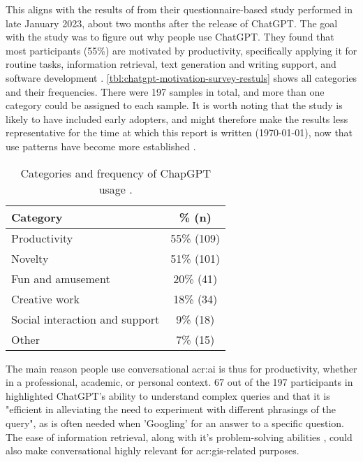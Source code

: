 This aligns with the results of \cite{skjuveWhyPeopleUse2023} from their questionnaire-based study performed in late January 2023, about two months after the release of ChatGPT. The goal with the study was to figure out why people use ChatGPT. They found that most participants (55\%) are motivated by productivity, specifically applying it for routine tasks, information retrieval, text generation and writing support, and software development \citep[17-21]{skjuveWhyPeopleUse2023}. \autoref{tbl:chatgpt-motivation-survey-restuls} shows all categories and their frequencies. There were 197 samples in total, and more than one category could be  assigned to each sample. It is worth noting that the study is likely to have included early adopters, and might therefore make the results less representative for the time at which this report is written (\today), now that use patterns have become more established \citep[37]{skjuveWhyPeopleUse2023}.

\begin{table}[ht]
    \centering
    \begin{tabular}[t]{l|c}
        \toprule
        \textbf{Category}              & \% \textbf{(n)} \\
        \midrule
        Productivity                   & 55\% (109)      \\
        Novelty                        & 51\% (101)      \\
        Fun and amusement              & 20\% (41)       \\
        Creative work                  & 18\% (34)       \\
        Social interaction and support & 9\% (18)        \\
        Other                          & 7\% (15)        \\
        \bottomrule
    \end{tabular}
    \caption{Categories and frequency of ChapGPT usage \citep[16-17]{skjuveWhyPeopleUse2023}.}
    \label{tbl:chatgpt-motivation-survey-restuls}
\end{table}

The main reason people use conversational \acrshort{acr:ai} is thus for productivity, whether in a professional, academic, or personal context. 67 out of the 197 participants in \cite[18]{skjuveWhyPeopleUse2023} highlighted ChatGPT's ability to understand complex queries and that it is "efficient in alleviating the need to experiment with different phrasings of the query", as is often needed when 'Googling' for an answer to a specific question. The ease of information retrieval, along with it's problem-solving abilities \citep[20]{skjuveWhyPeopleUse2023}, could also make conversational  highly relevant for \acrshort{acr:gis}-related purposes.

